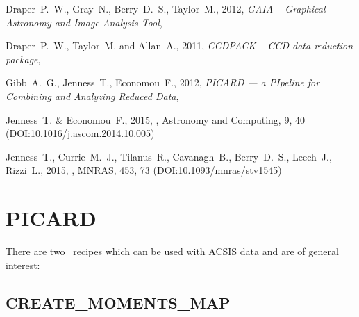 \documentclass[11pt,oneside,chapters]{starlink}
\begin{document}
\begin{thebibliography}{}
Draper~P.~W., Gray~N., Berry~D.~S., Taylor~M., 2012,
\textit{GAIA -- Graphical Astronomy and Image Analysis Tool},

Draper~P.~W., Taylor~M. and Allan~A., 2011, \textit{CCDPACK -- CCD data reduction package},

Gibb~A.~G., Jenness~T., Economou~F., 2012, \textit{PICARD --- a
PIpeline for Combining and Analyzing Reduced Data},

Jenness~T. \& Economou~F., 2015,
, Astronomy and
Computing, 9, 40 (DOI:10.1016/j.ascom.2014.10.005)

Jenness~T., Currie~M.~J., Tilanus~R., Cavanagh~B., Berry~D.~S.,
Leech~J., Rizzi~L., 2015, ,
MNRAS, 453, 73 (DOI:10.1093/mnras/stv1545)

\end{thebibliography}

\newpage
\appendix

\chapter{PICARD}
\label{app:picard}
There are two \picard\ recipes which can be used with ACSIS data and are of general interest:

\section{CREATE\_MOMENTS\_MAP}
\end{document}
